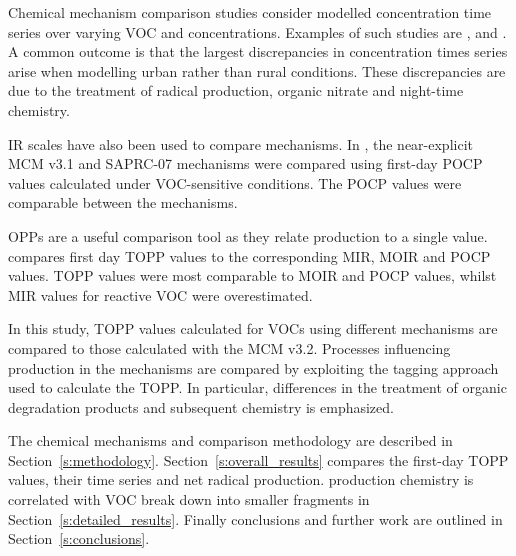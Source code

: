 Chemical mechanism comparison studies consider modelled  concentration time series over varying VOC and  concentrations. 
Examples of such studies are \citet{Dunker:1984}, \citet{Kuhn:1998} and \citet{Emmerson:2009}.
A common outcome is that the largest discrepancies in  concentration times series arise when modelling urban rather than rural conditions.
These discrepancies are due to the treatment of radical production, organic nitrate and night-time chemistry.

IR scales have also been used to compare mechanisms.
In \citet{Derwent:2010}, the near-explicit MCM v3.1 and SAPRC-07 mechanisms were compared using first-day POCP values calculated under VOC-sensitive conditions. 
The POCP values were comparable between the mechanisms. 

OPPs are a useful comparison tool as they relate  production to a single value. 
\citet{Butler:2011} compares first day TOPP values to the corresponding MIR, MOIR and POCP values.
TOPP values were most comparable to MOIR and POCP values, whilst MIR values for reactive VOC were overestimated.

In this study, TOPP values calculated for VOCs using different mechanisms are compared to those calculated with the MCM v3.2. 
Processes influencing  production in the mechanisms are compared by exploiting the tagging approach used to calculate the TOPP.
In particular, differences in the treatment of organic degradation products and subsequent chemistry is emphasized.

The chemical mechanisms and comparison methodology are described in \mbox{Section \ref{s:methodology}}. 
\mbox{Section \ref{s:overall_results}} compares the first-day TOPP values, their time series and net radical production. 
 production chemistry is correlated with VOC break down into smaller fragments in \mbox{Section \ref{s:detailed_results}}. 
Finally conclusions and further work are outlined in \mbox{Section \ref{s:conclusions}}.  
